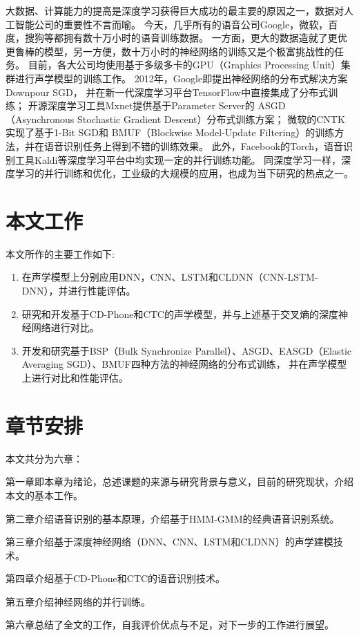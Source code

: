 大数据、计算能力的提高是深度学习获得巨大成功的最主要的原因之一，数据对人工智能公司的重要性不言而喻。
今天，几乎所有的语音公司Google，微软，百度，搜狗等都拥有数十万小时的语音训练数据。
一方面，更大的数据造就了更优更鲁棒的模型，另一方便，数十万小时的神经网络的训练又是个极富挑战性的任务。
目前，各大公司均使用基于多级多卡的GPU（Graphics Processing Unit）集群进行声学模型的训练工作。
2012年，Google即提出神经网络的分布式解决方案Downpour SGD，
并在新一代深度学习平台TensorFlow中直接集成了分布式训练；
开源深度学习工具Mxnet提供基于Parameter Server的
ASGD（Asynchronous Stochastic Gradient Descent）分布式训练方案；
微软的CNTK实现了基于1-Bit SGD和
BMUF（Blockwise Model-Update Filtering）的训练方法，并在语音识别任务上得到不错的训练效果。
此外，Facebook的Torch，语音识别工具Kaldi等深度学习平台中均实现一定的并行训练功能。
同深度学习一样，深度学习的并行训练和优化，工业级的大规模的应用，也成为当下研究的热点之一。


\section{本文工作}

本文所作的主要工作如下:
\begin{enumerate}
\item 在声学模型上分别应用DNN，CNN、LSTM和CLDNN（CNN-LSTM-DNN），并进行性能评估。
\item 研究和开发基于CD-Phone和CTC的声学模型，并与上述基于交叉熵的深度神经网络进行对比。
\item 开发和研究基于BSP（Bulk Synchronize Parallel）、ASGD、EASGD（Elastic Averaging SGD）、BMUF四种方法的神经网络的分布式训练，
并在声学模型上进行对比和性能评估。
\end{enumerate}

\section{章节安排}

本文共分为六章：

第一章即本章为绪论，总述课题的来源与研究背景与意义，目前的研究现状，介绍本文的基本工作。

第二章介绍语音识别的基本原理，介绍基于HMM-GMM的经典语音识别系统。

第三章介绍基于深度神经网络（DNN、CNN、LSTM和CLDNN）的声学建模技术。

第四章介绍基于CD-Phone和CTC的语音识别技术。

第五章介绍神经网络的并行训练。

第六章总结了全文的工作，自我评价优点与不足，对下一步的工作进行展望。
